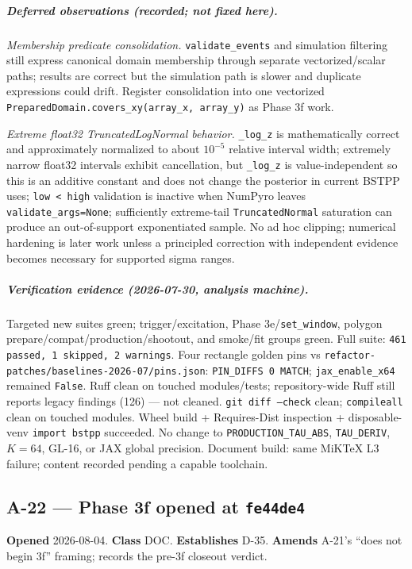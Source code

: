 \documentclass[
  10pt,
]{article}
\begin{document}
\subparagraph{Deferred observations (recorded; not fixed here).}
\textit{Membership predicate consolidation.} \texttt{validate\_events} and simulation filtering still express canonical domain membership through separate vectorized/scalar paths; results are correct but the simulation path is slower and duplicate expressions could drift.
Register consolidation into one vectorized \texttt{PreparedDomain.covers\_xy(array\_x, array\_y)} as Phase 3f work.

\textit{Extreme float32 TruncatedLogNormal behavior.} \texttt{\_log\_z} is mathematically correct and approximately normalized to about $10^{-5}$ relative interval width; extremely narrow float32 intervals exhibit cancellation, but \texttt{\_log\_z} is value-independent so this is an additive constant and does not change the posterior in current BSTPP uses; \texttt{low < high} validation is inactive when NumPyro leaves \texttt{validate\_args=None}; sufficiently extreme-tail \texttt{TruncatedNormal} saturation can produce an out-of-support exponentiated sample.
No ad hoc clipping; numerical hardening is later work unless a principled correction with independent evidence becomes necessary for supported sigma ranges.

\subparagraph{Verification evidence (2026-07-30, analysis machine).}
Targeted new suites green; trigger/excitation, Phase 3e/\texttt{set\_window}, polygon prepare/compat/production/shootout, and smoke/fit groups green.
Full suite: \texttt{461 passed, 1 skipped, 2 warnings}.
Four rectangle golden pins vs \texttt{refactor-patches/baselines-2026-07/pins.json}: \texttt{PIN\_DIFFS 0 MATCH}; \texttt{jax\_enable\_x64} remained \texttt{False}.
Ruff clean on touched modules/tests; repository-wide Ruff still reports legacy findings (126) --- not cleaned.
\texttt{git diff --check} clean; \texttt{compileall} clean on touched modules.
Wheel build + Requires-Dist inspection + disposable-venv \texttt{import bstpp} succeeded.
No change to \texttt{PRODUCTION\_TAU\_ABS}, \texttt{TAU\_DERIV}, $K{=}64$, GL-16, or JAX global precision.
Document build: same MiKTeX L3 failure; content recorded pending a capable toolchain.


\hypertarget{a-22}{%
\subsection{A-22 --- Phase 3f opened at \texttt{fe44de4}}\label{a-22}}

\textbf{Opened} 2026-08-04. \textbf{Class} DOC. \textbf{Establishes} D-35. \textbf{Amends} A-21's ``does not begin 3f'' framing; records the pre-3f closeout verdict.
\end{document}
